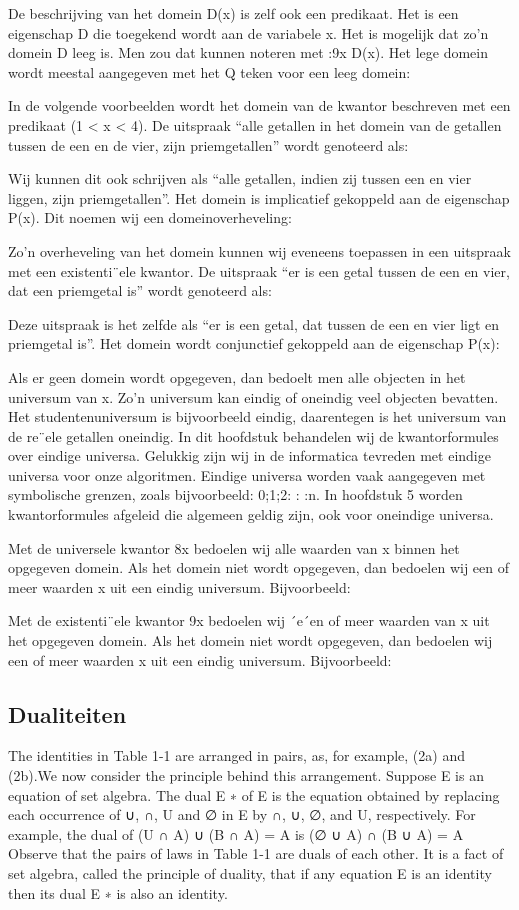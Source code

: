 \documentclass{article}
\begin{document}
De beschrijving van het domein D(x) is zelf ook een predikaat. Het is een eigenschap D
die toegekend wordt aan de variabele x. Het is mogelijk dat zo’n domein D leeg is. Men
zou dat kunnen noteren met :9x D(x). Het lege domein wordt meestal aangegeven met
het Q teken voor een leeg domein:

In de volgende voorbeelden wordt het domein van de kwantor beschreven met een predikaat
(1 < x < 4). De uitspraak “alle getallen in het domein van de getallen tussen de een
en de vier, zijn priemgetallen” wordt genoteerd als:

Wij kunnen dit ook schrijven als “alle getallen, indien zij tussen een en vier liggen, zijn
priemgetallen”. Het domein is implicatief gekoppeld aan de eigenschap P(x). Dit noemen
wij een domeinoverheveling:

Zo’n overheveling van het domein kunnen wij eveneens toepassen in een uitspraak met
een existenti¨ele kwantor. De uitspraak “er is een getal tussen de een en vier, dat een
priemgetal is” wordt genoteerd als:

Deze uitspraak is het zelfde als “er is een getal, dat tussen de een en vier ligt en priemgetal
is”. Het domein wordt conjunctief gekoppeld aan de eigenschap P(x):


Als er geen domein wordt opgegeven, dan bedoelt men alle objecten in het universum van
x. Zo’n universum kan eindig of oneindig veel objecten bevatten. Het studentenuniversum
is bijvoorbeeld eindig, daarentegen is het universum van de re¨ele getallen oneindig.
In dit hoofdstuk behandelen wij de kwantorformules over eindige universa. Gelukkig zijn
wij in de informatica tevreden met eindige universa voor onze algoritmen. Eindige universa
worden vaak aangegeven met symbolische grenzen, zoals bijvoorbeeld: 0;1;2: : :n.
In hoofdstuk 5 worden kwantorformules afgeleid die algemeen geldig zijn, ook voor oneindige
universa.

Met de universele kwantor 8x bedoelen wij alle waarden van x binnen het opgegeven
domein. Als het domein niet wordt opgegeven, dan bedoelen wij een of meer waarden x
uit een eindig universum. Bijvoorbeeld:


Met de existenti¨ele kwantor 9x bedoelen wij ´e´en of meer waarden van x uit het opgegeven
domein. Als het domein niet wordt opgegeven, dan bedoelen wij een of meer waarden x
uit een eindig universum. Bijvoorbeeld:





	\subsection{Dualiteiten}
	The identities in Table 1-1 are arranged in pairs, as, for example, (2a) and (2b).We now consider the principle
	behind this arrangement. Suppose E is an equation of set algebra. The dual E
	∗ of E is the equation obtained by
	replacing each occurrence of ∪, ∩, U and ∅ in E by ∩, ∪, ∅, and U, respectively. For example, the dual of
	(U ∩ A) ∪ (B ∩ A) = A is (∅ ∪ A) ∩ (B ∪ A) = A
	Observe that the pairs of laws in Table 1-1 are duals of each other. It is a fact of set algebra, called the principle
	of duality, that if any equation E is an identity then its dual E
	∗ is also an identity.
	
\end{document}
